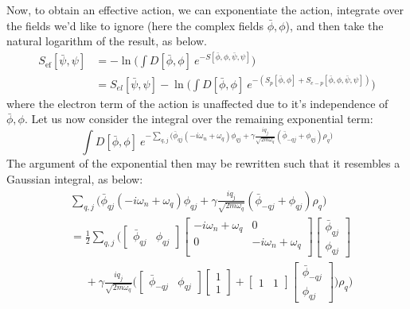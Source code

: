 \documentclass[10pt,a4paper]{article}
\begin{document}
\begin{multicols}{2}
Now, to obtain an effective action, we can exponentiate the action, integrate over the fields we'd like to ignore (here the complex fields $\bar{\phi},\phi$), and then take the natural logarithm of the result, as below.\scriptsize
\begin{align*}
S_{\text{ef}}[\bar{\psi},\psi] & = -\ln\Big( \int D[\bar{\phi},\phi] \ e^{-S[\bar{\phi},\phi,\bar{\psi},\psi]} \Big)\\
& = S_{el}[\bar{\psi},\psi]-\ln\Big( \int D[\bar{\phi},\phi] \ e^{-(S_{p}[\bar{\phi},\phi]+S_{e-p}[\bar{\phi},\phi,\bar{\psi},\psi])} \Big)
\end{align*}\normalsize
where the electron term of the action is unaffected due to it's independence of $\bar{\phi},\phi$. Let us now consider the integral over the remaining exponential term:\small
$$
\int D[\bar{\phi},\phi] \ e^{-\sum_{q,j}\Big(\bar{\phi}_{qj}(-i\omega_n + \omega_q)\phi_{qj}+\gamma\frac{i q_j}{\sqrt{2m\omega_q}}(\bar{\phi}_{-qj}+\phi_{qj})\rho_q\Big)}
$$\normalsize
The argument of the exponential then may be rewritten such that it resembles a Gaussian integral, as below:\small
\begin{align*}
&
\sum_{q,j}\Big(\bar{\phi}_{qj}(-i\omega_n + \omega_q)\phi_{qj}+\gamma\frac{i q_j}{\sqrt{2m\omega_q}}(\bar{\phi}_{-qj}+\phi_{qj})\rho_q\Big)\\
&= \frac{1}{2}\sum_{q,j}\Bigg(\begin{bmatrix}
\bar{\phi}_{qj} & \phi_{qj}
\end{bmatrix}\begin{bmatrix}
-i\omega_n + \omega_q & 0 \\
0 & -i\omega_n + \omega_q \\
\end{bmatrix}\begin{bmatrix}
\bar{\phi}_{qj} \\ \phi_{qj}
\end{bmatrix}\\
& \ \ \ \ \ \ + \gamma \frac{i q_j}{\sqrt{2m \omega_q}}\Big(\begin{bmatrix}
\bar{\phi}_{-qj} & \phi_{qj}
\end{bmatrix}\begin{bmatrix}
1 \\ 1 
\end{bmatrix}+\begin{bmatrix}
1 & 1 
\end{bmatrix}\begin{bmatrix}
\bar{\phi}_{-qj} \\ \phi_{qj}
\end{bmatrix} \Big)\rho_q \Bigg)\\

\end{align*}
\end{multicols}
\end{document}
